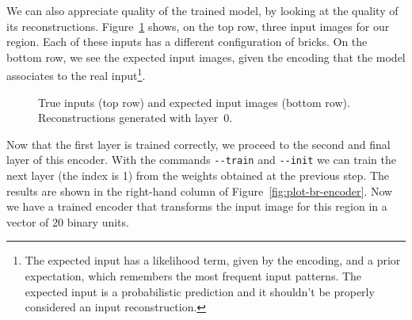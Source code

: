 We can also appreciate quality of the trained model, by looking at the quality
of its reconstructions. Figure~\ref{fig:imgs-br-encoder-0} shows, on the top
row, three input images for our region. Each of these inputs has a different
configuration of bricks. On the bottom row, we see the expected input images,
given the encoding that the model associates to the real input\footnote{
	The expected input has a likelihood term, given by the encoding, and a prior
	expectation, which remembers the most frequent input patterns. The expected
	input is a probabilistic prediction and it shouldn't be properly considered
	an input reconstruction.
}.

\begin{figure}
	\centering
	\caption{True inputs (top row) and expected input images (bottom row).
	Reconstructions generated with layer~0.}
	\label{fig:imgs-br-encoder-0}
\end{figure}

Now that the first layer is trained correctly, we proceed to the second and
final layer of this encoder. With the commands \verb|--train| and
\verb|--init| we can train the next layer (the index is 1) from the weights
obtained at the previous step. The results are shown in the right-hand column
of Figure~\ref{fig:plot-br-encoder}. Now we have a trained encoder that
transforms the input image for this region in a vector of 20 binary units.


